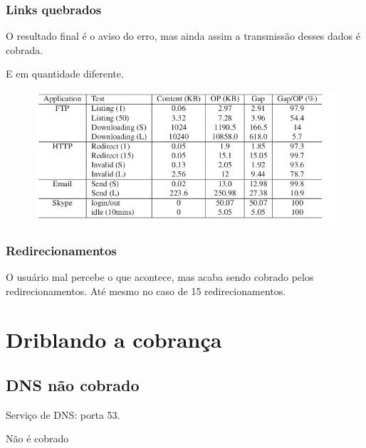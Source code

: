\documentclass[brazil]{beamer}
\begin{document}
\begin{frame}[fragile]
    \frametitle{Links quebrados}
    O resultado final é o aviso do erro, mas ainda assim a transmissão desses dados é cobrada.

    E em quantidade diferente.

    \begin{figure}
    \begin{center}
        \includegraphics[scale=0.3]{images/applications.jpg}
    \end{center}
    \end{figure}
\end{frame}

\begin{frame}[fragile]
    \frametitle{Redirecionamentos}
    O usuário mal percebe o que acontece, mas acaba sendo cobrado pelos redirecionamentos. Até mesmo no caso de 15 redirecionamentos.
\end{frame}

\section{Driblando a cobrança}

\subsection{DNS não cobrado}
\begin{frame}[fragile]
    Serviço de DNS: porta 53.

    \vspace{0.4cm}
    \Huge{Não é cobrado}
\end{frame}
\end{document}
